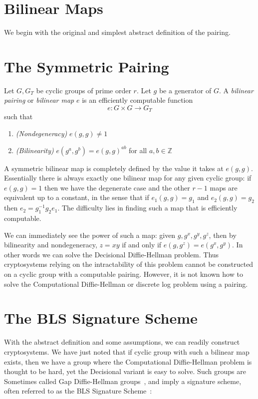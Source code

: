 \section{Bilinear Maps}

We begin with the original and simplest abstract definition of the pairing.

\section{\label{sec:symmetricpairing}The Symmetric Pairing}

Let $G, G_T$ be cyclic groups of prime order $r$.
Let $g$ be a generator of $G$.
A \emph{bilinear pairing} or \emph{bilinear map}
$e$ is an efficiently computable function
\[
e:G \times G \rightarrow G_T
\]
such that
\begin{enumerate}
\item
\emph{(Nondegeneracy)}
$e(g,g) \ne 1$
\item
\emph{(Bilinearity)}
$e(g^a, g^b) = e(g,g)^{a b}$ for all $a, b \in \mathbb{Z}$
\end{enumerate}

A symmetric bilinear map is completely defined by the value it
takes at $e(g,g)$. Essentially there is always exactly one bilinear map
for any given cyclic group: if
$e(g,g)=1$ then we have the degenerate case and the other $r-1$ maps are
equivalent up to a constant,
in the sense that if $e_1(g,g) = g_1$ and $e_2(g,g) = g_2$
then $e_2 = g_1^{-1} g_2 e_1$. The difficulty lies in finding such a map
that is efficiently computable.

We can immediately see the power of such a map: given
$g, g^x, g^y, g^z$, then by bilinearity and nondegeneracy,
$z = x y$ if and only if
$e(g, g^z) = e(g^x, g^y)$. In other words we can solve the Decisional
Diffie-Hellman problem.
Thus cryptosystems relying on the intractability of this
problem cannot be constructed on a cyclic group with
a computable pairing.
However, it is not known how to solve the Computational Diffie-Hellman
or discrete log problem using a pairing.

\section{The BLS Signature Scheme}

With the abstract definition and some assumptions,
we can readily construct cryptosystems.
We have just noted that if cyclic group with such a
bilinear map exists, then we have a group where the Computational
Diffie-Hellman
problem is thought to be hard, yet the Decisional variant is easy to solve.
Such groups are Sometimes called Gap Diffie-Hellman groups~\cite{op}, and
imply a signature scheme,
often referred to as the BLS Signature Scheme~\cite{bls}:

